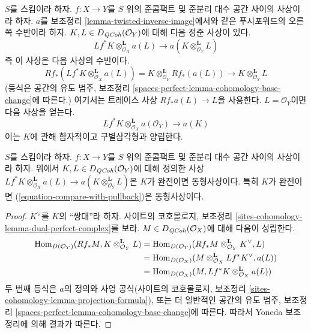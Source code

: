 \noindent
$S$를 스킴이라 하자.
$f : X \to Y$를 $S$ 위의 준콤팩트 및 준분리 대수 공간 사이의 사상이라
하자. $a$를 보조정리 \ref{lemma-twisted-inverse-image}에서와 같은
푸시포워드의 오른쪽 수반이라 하자.
$K, L \in D_{\mathit{QCoh}}(\mathcal{O}_Y)$에 대해 다음 정준 사상이 있다.
$$
Lf^*K \otimes^\mathbf{L}_{\mathcal{O}_X} a(L)
\longrightarrow
a(K \otimes_{\mathcal{O}_Y}^\mathbf{L} L)
$$
즉 이 사상은 다음 사상의 수반이다.
$$
Rf_*(Lf^*K \otimes^\mathbf{L}_{\mathcal{O}_X} a(L)) =
K \otimes^\mathbf{L}_{\mathcal{O}_Y} Rf_*(a(L))
\longrightarrow
K \otimes^\mathbf{L}_{\mathcal{O}_Y} L
$$
(등식은 공간의 유도 범주, 보조정리
\ref{spaces-perfect-lemma-cohomology-base-change}에 따른다.)
여기서는 트레이스 사상 $Rf_*a(L) \to L$을 사용한다.
$L = \mathcal{O}_Y$이면 다음 사상을 얻는다.
\begin{equation}
\label{equation-compare-with-pullback}
Lf^*K \otimes^\mathbf{L}_{\mathcal{O}_X} a(\mathcal{O}_Y) \longrightarrow a(K)
\end{equation}
이는 $K$에 관해 함자적이고 구별삼각형과 양립한다.

\begin{lemma}
\label{lemma-compare-with-pullback-perfect}
$S$를 스킴이라 하자.
$f : X \to Y$를 $S$ 위의 준콤팩트 및 준분리 대수 공간 사이의
사상이라 하자. 위에서 $K, L \in D_{\mathit{QCoh}}(\mathcal{O}_Y)$에 대해 정의한
사상
$Lf^*K \otimes^\mathbf{L}_{\mathcal{O}_X} a(L) \to
a(K \otimes_{\mathcal{O}_Y}^\mathbf{L} L)$은 $K$가 완전이면
동형사상이다. 특히 $K$가 완전이면
(\ref{equation-compare-with-pullback})은 동형사상이다.
\end{lemma}

\begin{proof}
$K^\vee$를 $K$의 “쌍대”라 하자. 사이트의 코호몰로지, 보조정리
\ref{sites-cohomology-lemma-dual-perfect-complex}를 보라.
$M \in D_{\mathit{QCoh}}(\mathcal{O}_X)$에 대해 다음이 성립한다.
\begin{align*}
\mathop{\mathrm{Hom}}\nolimits_{D(\mathcal{O}_Y)}(Rf_*M, K \otimes^\mathbf{L}_{\mathcal{O}_Y} L)
& =
\mathop{\mathrm{Hom}}\nolimits_{D(\mathcal{O}_Y)}(
Rf_*M \otimes^\mathbf{L}_{\mathcal{O}_Y} K^\vee, L) \\
& =
\mathop{\mathrm{Hom}}\nolimits_{D(\mathcal{O}_X)}(
M \otimes^\mathbf{L}_{\mathcal{O}_X} Lf^*K^\vee, a(L)) \\
& =
\mathop{\mathrm{Hom}}\nolimits_{D(\mathcal{O}_X)}(M,
Lf^*K \otimes^\mathbf{L}_{\mathcal{O}_X} a(L))
\end{align*}
두 번째 등식은 $a$의 정의와 사영 공식(사이트의 코호몰로지,
보조정리 \ref{sites-cohomology-lemma-projection-formula}), 또는 더 일반적인
공간의 유도 범주, 보조정리
\ref{spaces-perfect-lemma-cohomology-base-change}에 따른다.
따라서 Yoneda 보조정리에 의해 결과가 따른다.
\end{proof}

